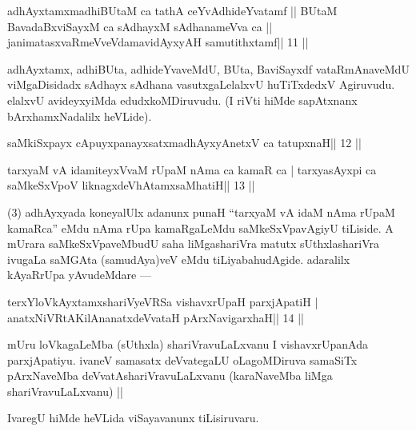 
\begin{shl}
adhAyxtamxmadhiBUtaM ca tathA ceYvAdhideYvatamf ||
BUtaM BavadaBxviSayxM ca sAdhayxM sAdhanameVva ca ||
janimatasxvaRmeVveVdamavidAyxyAH samutithxtamf\hfill || 11 ||
\end{shl}

\begin{artha}
adhAyxtamx, adhiBUta, adhideYvaveMdU, BUta, BaviSayxdf vataRmAnaveMdU 
viMgaDisidadx sAdhayx sAdhana vasutxgaLelalxvU huTiTxdedxV Agiruvudu. elalxvU avideyxyiMda edudxkoMDiruvudu. (I riVti hiMde sapAtxnanx bArxhamxNadalilx heVLide).
\end{artha} 
 

\begin{shl}
saMkiSxpayx cApuyxpanayxsatxmadhAyxyAnetxV ca tatupxnaH\hfill || 12 ||
\end{shl}

\begin{shl}
tarxyaM vA idamiteyxVvaM rUpaM nAma ca kamaR ca |
tarxyasAyxpi ca saMkeSxVpoV liknagxdeVhAtamxsaMhatiH\hfill || 13 ||
\end{shl}

\begin{artha}
(3) adhAyxyada koneyalUlx adanunx punaH ``tarxyaM vA idaM nAma rUpaM 
kamaRca'' eMdu nAma rUpa kamaRgaLeMdu saMkeSxVpavAgiyU tiLiside. A mUrara saMkeSxVpaveMbudU saha liMgashariVra matutx sUthxlashariVra ivugaLa saMGAta (samudAya)veV eMdu tiLiyabahudAgide. adaralilx kAyaRrUpa yAvudeMdare  {\rm ---} 
\end{artha}

\begin{shl}
terxYloVkAyxtamxshariVyeVRSa vishavxrUpaH parxjApatiH |
anatxNiVRtAKilAnanatxdeVvataH pArxNavigarxhaH\hfill || 14 ||
\end{shl}

\begin{artha}
mUru loVkagaLeMba (sUthxla) shariVravuLaLxvanu I vishavxrUpanAda 
parxjA\-patiyu. ivaneV samasatx deVvategaLU oLagoMDiruva samaSiTx pArxNaveMba deVvatAshariVravuLaLxvanu (karaNaveMba liMga shariVravuLaLxvanu) ||
\end{artha} 
 
\begin{artha}
IvaregU hiMde heVLida viSayavanunx tiLisiruvaru.
\end{artha} 
 
